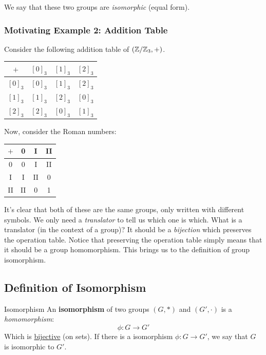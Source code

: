 \documentclass[letterpaper]{article}
\begin{document}
\bigskip 

We say that these two groups are \emph{isomorphic} (equal form). 

\subsubsection{Motivating Example 2: Addition Table}
Consider the following addition table of $(\mathbb{Z} / \mathbb{Z}_3, +)$.
\begin{center}
    \begin{tabular}{c|c c c}
        $+$     & $[0]_3$ & $[1]_3$ & $[2]_3$ \\ 
        \hline 
        $[0]_3$ & $[0]_3$ & $[1]_3$ & $[2]_3$ \\
        $[1]_3$ & $[1]_3$ & $[2]_3$ & $[0]_3$ \\
        $[2]_3$ & $[2]_3$ & $[0]_3$ & $[1]_3$ 
    \end{tabular}
\end{center}
Now, consider the Roman numbers: 
\begin{center}
    \begin{tabular}{c|c c c}
        $+$     & 0 & I & II \\ 
        \hline 
        0       & 0 & I & II \\ 
        I       & I & II & 0 \\ 
        II      & II & 0 & 1
    \end{tabular}
\end{center}
It's clear that both of these are the same groups, only written with different symbols. We only need a \emph{translator} to tell us which one is which. What is a translator (in the context of a group)? It should be a \emph{bijection} which preserves the operation table. Notice that preserving the operation table simply means that it should be a group homomorphism. This brings us to the definition of group isomorphism. 


\subsection{Definition of Isomorphism}
\begin{definition}{Isomorphism}{}
    An \textbf{isomorphism} of two groups $(G, *)$ and $(G', \cdot)$ is a \emph{homomorphism}: 
    \[\phi: G \to G'\]
    Which is \underline{bijective} (on sets). If there is a isomorphism $\phi: G \to G'$, we say that $G$ is isomorphic to $G'$. 
\end{definition}
\end{document}
